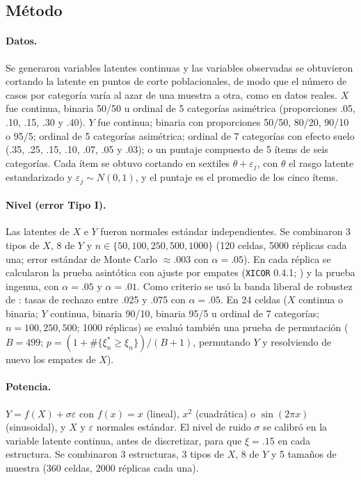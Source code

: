 \documentclass[man,donotrepeattitle,floatsintext]{apa7}
\begin{document}
\subsection{Método}

\paragraph{Datos.} Se generaron variables latentes continuas y las variables observadas se obtuvieron cortando la latente en puntos de corte poblacionales, de modo que el número de casos por categoría varía al azar de una muestra a otra, como en datos reales. $X$ fue continua, binaria 50/50 u ordinal de 5 categorías asimétrica (proporciones .05, .10, .15, .30 y .40). $Y$ fue continua; binaria con proporciones 50/50, 80/20, 90/10 o 95/5; ordinal de 5 categorías asimétrica; ordinal de 7 categorías con efecto suelo (.35, .25, .15, .10, .07, .05 y .03); o un puntaje compuesto de 5 ítems de seis categorías. Cada ítem se obtuvo cortando en sextiles $\theta+\varepsilon_j$, con $\theta$ el rasgo latente estandarizado y $\varepsilon_j\sim N(0,1)$, y el puntaje es el promedio de los cinco ítems.

\paragraph{Nivel (error Tipo I).} Las latentes de $X$ e $Y$ fueron normales estándar independientes. Se combinaron 3 tipos de $X$, 8 de $Y$ y $n\in\{50,100,250,500,1000\}$ (120 celdas, 5000 réplicas cada una; error estándar de Monte Carlo $\approx .003$ con $\alpha=.05$). En cada réplica se calcularon la prueba asintótica con ajuste por empates (\texttt{XICOR} 0.4.1; \cite{chatterjee2023xicor}) y la prueba ingenua, con $\alpha=.05$ y $\alpha=.01$. Como criterio se usó la banda liberal de robustez de \textcite{bradley1978}: tasas de rechazo entre .025 y .075 con $\alpha=.05$. En 24 celdas ($X$ continua o binaria; $Y$ continua, binaria 90/10, binaria 95/5 u ordinal de 7 categorías; $n=100,250,500$; 1000 réplicas) se evaluó también una prueba de permutación ($B=499$; $p=(1+\#\{\xi_n^*\ge\xi_n\})/(B+1)$, permutando $Y$ y resolviendo de nuevo los empates de $X$).

\paragraph{Potencia.} $Y=f(X)+\sigma\varepsilon$ con $f(x)=x$ (lineal), $x^2$ (cuadrática) o $\sin(2\pi x)$ (sinusoidal), y $X$ y $\varepsilon$ normales estándar. El nivel de ruido $\sigma$ se calibró en la variable latente continua, antes de discretizar, para que $\xi=.15$ en cada estructura. Se combinaron 3 estructuras, 3 tipos de $X$, 8 de $Y$ y 5 tamaños de muestra (360 celdas, 2000 réplicas cada una).
\end{document}
